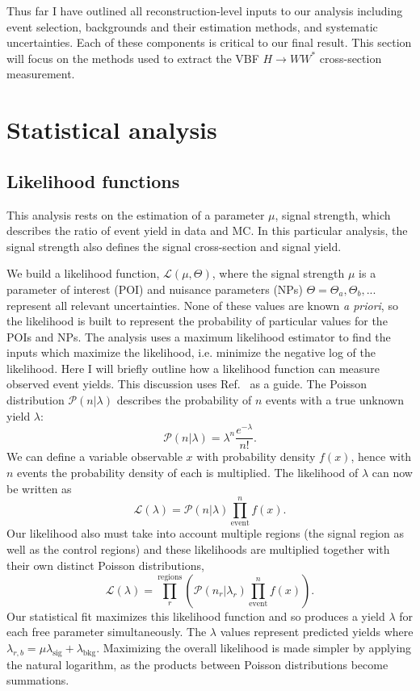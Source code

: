 Thus far I have outlined all reconstruction-level inputs to our analysis including event selection, backgrounds and their estimation methods, and systematic uncertainties. Each of these components is critical to our final result. This section will focus on the methods used to extract the VBF $H\rightarrow WW^*$ cross-section measurement. 
\section{Statistical analysis}
\subsection{Likelihood functions}
This analysis rests on the estimation of a parameter $\mu$, signal strength, which describes the ratio of event yield in data and MC. In this particular analysis, the signal strength also defines the signal cross-section and signal yield. 

We build a likelihood function, $\mathcal{L}(\mu,\Theta)$, where the signal strength $\mu$ is a parameter of interest (POI) and nuisance parameters (NPs) $\Theta=\Theta_a,\Theta_b,...$ represent all relevant uncertainties. None of these values are known \textit{a priori}, so the likelihood is built to represent the probability of particular values for the POIs and NPs. The analysis uses a maximum likelihood estimator to find the inputs which maximize the likelihood, i.e. minimize the negative log of the likelihood. Here I will briefly outline how a likelihood function can measure observed event yields. This discussion uses Ref.~\cite{cranmer2015practical} as a guide. The Poisson distribution $\mathcal{P}(n|\lambda)$ describes the probability of $n$ events with a true unknown yield $\lambda$:
\begin{equation}
\mathcal{P}(n|\lambda)= \lambda^n\frac{e^{-\lambda}}{n!}.
\end{equation}
We can define a variable observable $x$ with probability density $f(x)$, hence with $n$ events the probability density of each is multiplied. The likelihood of $\lambda$ can now be written as
\begin{equation}
\mathcal{L}(\lambda)=\mathcal{P}(n|\lambda)\prod_{\text{event}}^n f(x).
\end{equation}
Our likelihood also must take into account multiple regions (the signal region as well as the control regions) and these likelihoods are multiplied together with their own distinct Poisson distributions,
\begin{equation}
\mathcal{L}(\lambda)=\prod_r^{\text{regions}}(\mathcal{P}(n_r|\lambda_r)\prod_{\text{event}}^n f(x)).
\end{equation}
Our statistical fit maximizes this likelihood function and so produces a yield $\lambda$ for each free parameter simultaneously. The $\lambda$ values represent predicted yields where $\lambda_{r,b} = \mu \lambda_{\text{sig}}+\lambda_{\text{bkg}}$. Maximizing the overall likelihood is made simpler by applying the natural logarithm, as the products between Poisson distributions become summations.  

